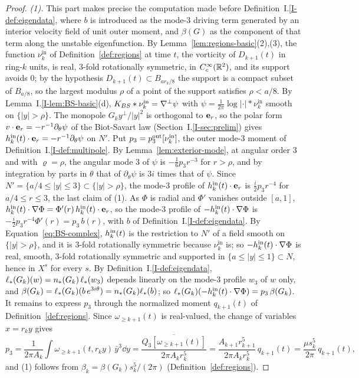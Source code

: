 \begin{proof}
\emph{(1).} This part makes precise the computation made before
Definition~I.\ref{I-def:eigendata}, where $b$ is introduced as the mode-$3$
driving term generated by an interior velocity field of unit outer moment, and
$\beta(G)$ as the component of that term along the unstable eigenfunction. By
Lemma~\ref{lem:regions-basic}(2),(3), the function
$\nu^{\mathrm{in}}_k$ of Definition~\ref{def:regions} at time $t$, the vorticity of
$D_{k+1}(t)$ in ring-$k$ units, is real,
$3$-fold rotationally symmetric, in $C_c^\infty(\mathbb{R}^2)$, and its support avoids $0$; by the
hypothesis $D_{k+1}(t)\subset B_{ar_k/8}$ the support is a compact subset of
$B_{a/8}$, so the largest modulus $\rho$ of a point of the support satisfies $\rho<a/8$. By
Lemma~I.\ref{I-lem:BS-basic}(d), $K_{BS}\ast\nu^{\mathrm{in}}_k=\nabla^\perp\psi$ with
$\psi=\frac1{2\pi}\log|\cdot|\ast\nu^{\mathrm{in}}_k$ smooth on $\{|y|>\rho\}$.
The monopole $G_ky^\perp/|y|^2$ is orthogonal to $\textbf{e}_r$, so the polar form
$v\cdot\textbf{e}_r=-r^{-1}\partial_\theta\psi$ of the Biot-Savart law
(Section~I.\ref{I-sec:prelim}) gives $h^{\mathrm{in}}_k(t)\cdot\textbf{e}_r=-r^{-1}\partial_\theta\psi$
on $N'$. Put $p_3=p^{\mathrm{out}}_3[\nu^{\mathrm{in}}_k]$, the outer mode-$3$ moment of
Definition~I.\ref{I-def:multipole}. By Lemma~\ref{lem:exterior-mode}, at angular order $3$ and with $\varrho=\rho$, the angular mode $3$ of $\psi$ is
$-\frac16p_3r^{-3}$ for $r>\rho$, and by integration by parts in $\theta$ that of
$\partial_\theta\psi$ is $3i$ times that of $\psi$. Since
$N'=\{a/4\le|y|\le3\}\subset\{|y|>\rho\}$, the mode-$3$ profile of
$h^{\mathrm{in}}_k(t)\cdot\textbf{e}_r$ is $\frac i2p_3r^{-4}$ for $a/4\le r\le3$, the last claim
of (1). As $\Phi$ is radial and $\Phi'$ vanishes outside $[a,1]$,
$h^{\mathrm{in}}_k(t)\cdot\nabla\Phi=\Phi'(r)\,h^{\mathrm{in}}_k(t)\cdot\textbf{e}_r$, so the mode-$3$
profile of $-h^{\mathrm{in}}_k(t)\cdot\nabla\Phi$ is
$-\frac i2p_3r^{-4}\Phi'(r)=p_3\,b(r)$, with $b$ of Definition~I.\ref{I-def:eigendata}.
By Equation~\eqref{eq:BS-complex}, $h^{\mathrm{in}}_k(t)$ is the restriction to
$N'$ of a field smooth on $\{|y|>\rho\}$, and it is $3$-fold rotationally symmetric because
$\nu^{\mathrm{in}}_k$ is; so $-h^{\mathrm{in}}_k(t)\cdot\nabla\Phi$ is real, smooth,
$3$-fold rotationally symmetric and supported in $\{a\le|y|\le1\}\subset N$, hence in $X^s$
for every $s$. By Definition~I.\ref{I-def:eigendata}, $\ell_*(G_k)(w)=n_*(G_k)\,\ell_*(w_3)$
depends linearly on the mode-$3$ profile $w_3$ of $w$ only, and
$\beta(G_k)=\ell_*(G_k)(b\,e^{3i\theta})=n_*(G_k)\ell_*(b)$; so
$\ell_*(G_k)(-h^{\mathrm{in}}_k(t)\cdot\nabla\Phi)=p_3\,\beta(G_k)$. It remains to
express $p_3$ through the normalized moment $q_{k+1}(t)$ of
Definition~\ref{def:regions}. Since $\omega_{\ge k+1}(t)$ is real-valued,
the change of variables $x=r_ky$ gives
\[
p_3=\frac1{2\pi A_k}\int\omega_{\ge k+1}(t,r_ky)\,\bar y^3\dd y
=\frac{\overline{Q_3[\omega_{\ge k+1}(t)]}}{2\pi A_kr_k^5}
=\frac{A_{k+1}r_{k+1}^5}{2\pi A_kr_k^5}\,q_{k+1}(t)=\frac{\mu s_k^5}{2\pi}\,q_{k+1}(t),
\]
and (1) follows from $\beta_k=\beta(G_k)s_k^5/(2\pi)$
(Definition~\ref{def:regions}).


\end{proof}
